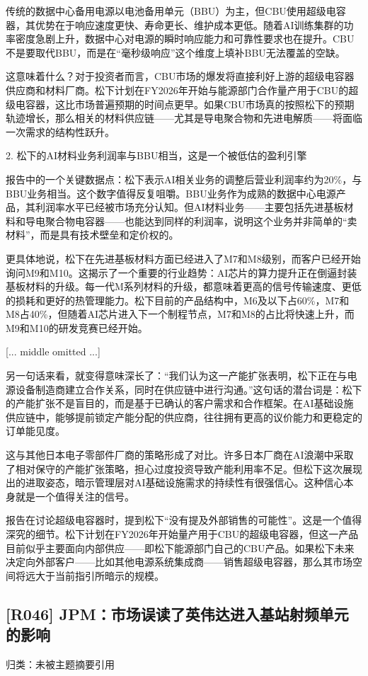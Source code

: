 \documentclass[11pt]{ctexart}
\begin{document}
传统的数据中心备用电源以电池备用单元（BBU）为主，但CBU使用超级电容器，其优势在于响应速度更快、寿命更长、维护成本更低。随着AI训练集群的功率密度急剧上升，数据中心对电源的瞬时响应能力和可靠性要求也在提升。CBU不是要取代BBU，而是在“毫秒级响应”这个维度上填补BBU无法覆盖的空缺。

这意味着什么？对于投资者而言，CBU市场的爆发将直接利好上游的超级电容器供应商和材料厂商。松下计划在FY2026年开始与能源部门合作量产用于CBU的超级电容器，这比市场普遍预期的时间点更早。如果CBU市场真的按照松下的预期轨迹增长，那么相关的材料供应链——尤其是导电聚合物和先进电解质——将面临一次需求的结构性跃升。

2. 松下的AI材料业务利润率与BBU相当，这是一个被低估的盈利引擎

报告中的一个关键数据点：松下表示AI相关业务的调整后营业利润率约为20\%，与BBU业务相当。这个数字值得反复咀嚼。BBU业务作为成熟的数据中心电源产品，其利润率水平已经被市场充分认知。但AI材料业务——主要包括先进基板材料和导电聚合物电容器——也能达到同样的利润率，说明这个业务并非简单的“卖材料”，而是具有技术壁垒和定价权的。

更具体地说，松下在先进基板材料方面已经进入了M7和M8级别，而客户已经开始询问M9和M10。这揭示了一个重要的行业趋势：AI芯片的算力提升正在倒逼封装基板材料的升级。每一代M系列材料的升级，都意味着更高的信号传输速度、更低的损耗和更好的热管理能力。松下目前的产品结构中，M6及以下占60\%，M7和M8占40\%，但随着AI芯片进入下一个制程节点，M7和M8的占比将快速上升，而M9和M10的研发竞赛已经开始。

[... middle omitted ...]

另一句话来看，就变得意味深长了：“我们认为这一产能扩张表明，松下正在与电源设备制造商建立合作关系，同时在供应链中进行沟通。”这句话的潜台词是：松下的产能扩张不是盲目的，而是基于已确认的客户需求和合作框架。在AI基础设施供应链中，能够提前锁定产能分配的供应商，往往拥有更高的议价能力和更稳定的订单能见度。

这与其他日本电子零部件厂商的策略形成了对比。许多日本厂商在AI浪潮中采取了相对保守的产能扩张策略，担心过度投资导致产能利用率不足。但松下这次展现出的进取姿态，暗示管理层对AI基础设施需求的持续性有很强信心。这种信心本身就是一个值得关注的信号。

报告在讨论超级电容器时，提到松下“没有提及外部销售的可能性”。这是一个值得深究的细节。松下计划在FY2026年开始量产用于CBU的超级电容器，但这一产品目前似乎主要面向内部供应——即松下能源部门自己的CBU产品。如果松下未来决定向外部客户——比如其他电源系统集成商——销售超级电容器，那么其市场空间将远大于当前指引所暗示的规模。

\subsection{[R046] JPM：市场误读了英伟达进入基站射频单元的影响}
{\small\color{refgray}归类：未被主题摘要引用}
\end{document}
